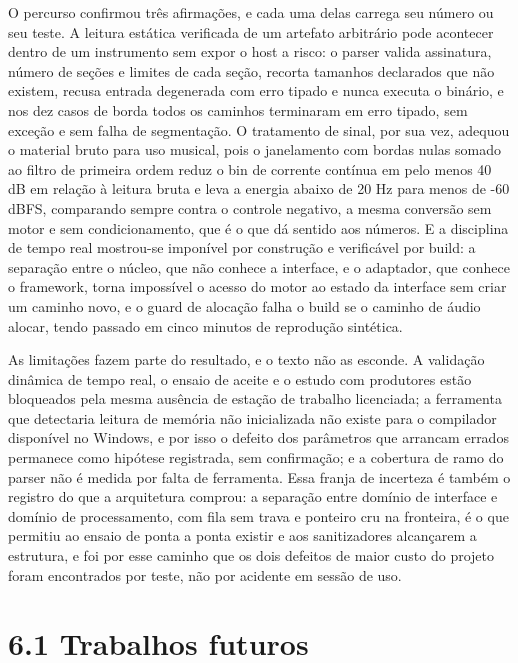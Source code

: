 \documentclass[11pt,a4paper]{article}
\begin{document}
O percurso confirmou três afirmações, e cada uma delas carrega seu número ou seu teste. A leitura estática verificada de um artefato arbitrário pode acontecer dentro de um instrumento sem expor o host a risco: o parser valida assinatura, número de seções e limites de cada seção, recorta tamanhos declarados que não existem, recusa entrada degenerada com erro tipado e nunca executa o binário, e nos dez casos de borda todos os caminhos terminaram em erro tipado, sem exceção e sem falha de segmentação. O tratamento de sinal, por sua vez, adequou o material bruto para uso musical, pois o janelamento com bordas nulas somado ao filtro de primeira ordem reduz o bin de corrente contínua em pelo menos 40 dB em relação à leitura bruta e leva a energia abaixo de 20 Hz para menos de -60 dBFS, comparando sempre contra o controle negativo, a mesma conversão sem motor e sem condicionamento, que é o que dá sentido aos números. E a disciplina de tempo real mostrou-se imponível por construção e verificável por build: a separação entre o núcleo, que não conhece a interface, e o adaptador, que conhece o framework, torna impossível o acesso do motor ao estado da interface sem criar um caminho novo, e o guard de alocação falha o build se o caminho de áudio alocar, tendo passado em cinco minutos de reprodução sintética.


As limitações fazem parte do resultado, e o texto não as esconde. A validação dinâmica de tempo real, o ensaio de aceite e o estudo com produtores estão bloqueados pela mesma ausência de estação de trabalho licenciada; a ferramenta que detectaria leitura de memória não inicializada não existe para o compilador disponível no Windows, e por isso o defeito dos parâmetros que arrancam errados permanece como hipótese registrada, sem confirmação; e a cobertura de ramo do parser não é medida por falta de ferramenta. Essa franja de incerteza é também o registro do que a arquitetura comprou: a separação entre domínio de interface e domínio de processamento, com fila sem trava e ponteiro cru na fronteira, é o que permitiu ao ensaio de ponta a ponta existir e aos sanitizadores alcançarem a estrutura, e foi por esse caminho que os dois defeitos de maior custo do projeto foram encontrados por teste, não por acidente em sessão de uso.


\section*{6.1 Trabalhos futuros}
\end{document}
